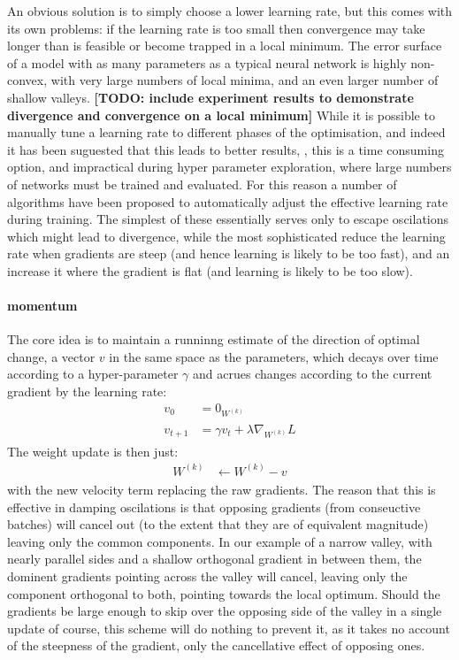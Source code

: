 \documentclass[msc]{infthesis}
\newcommand{\weights}[2][]{W_{#1}^{(#2)}}
\newcommand{\TODO}[1]{\textbf{[TODO: {#1}]}}
\begin{document}
An obvious
solution is to simply choose a lower learning rate, but this comes with its own problems:
if the learning rate is too small then convergence may take longer than is feasible or become
trapped in a local minimum.  The error surface of a model with as many parameters as a typical
neural network is highly non-convex, with very large numbers of local minima, and an even larger
number of shallow valleys.
%
\TODO{include experiment results to demonstrate divergence and convergence on a local minimum}
%
While it is possible to manually tune a learning rate to different phases of the optimisation,
and indeed it has been suguested that this leads to better results, \cite{goodfellow2016deep},
this is a time consuming option, and impractical during hyper parameter exploration, where large
numbers of networks must be trained and evaluated.  For this reason a number of algorithms have
been proposed to automatically adjust the effective learning rate during training.  The simplest
of these essentially serves only to escape oscilations which might lead to divergence, while the
most sophisticated reduce the learning rate when gradients are steep (and hence learning is likely to
be too fast), and an increase it where the gradient is flat (and learning is likely to be
too slow).


\paragraph*{momentum}
The core idea is to maintain a runninng estimate of the direction of optimal change, a vector
\(v\) in the same space as the parameters, which decays over time according to a hyper-parameter
\(\gamma\) and acrues changes according to the current gradient by the learning rate:
\begin{align}
  \label{eq:momentum}
  v_{0}
  &=
    0_{\weights{k}}
    \\
  v_{t+1}
  &=
    \gamma v_{t} + \lambda \nabla_{\weights{k}} L
\end{align}
The weight update is then just:
\begin{align}
  \weights{k}
  &\longleftarrow
    \weights{k} - v
\end{align}
with the new velocity term replacing the raw gradients.  The reason that this is effective in
damping oscilations is that opposing gradients (from conseuctive batches) will cancel out (to
the extent that they are of equivalent magnitude) leaving only the common components.  In our
example of a narrow valley, with nearly parallel sides and a shallow orthogonal gradient in
between them, the dominent gradients pointing across the valley will cancel, leaving only the
component orthogonal to both, pointing towards the local optimum.  Should the gradients be
large enough to skip over the opposing side of the valley in a single update of course, this
scheme will do nothing to prevent it, as it takes no account of the steepness of the gradient,
only the cancellative effect of opposing ones.
\end{document}

